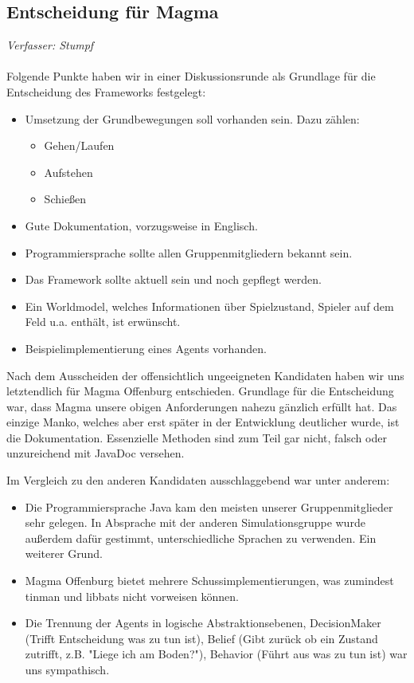 \documentclass[fontsize=12pt,a4paper,final]{scrartcl}[2003/01/01]
\begin{document}
\subsection{Entscheidung für Magma}
\textit{Verfasser: Stumpf}\\
\\
Folgende Punkte haben wir in einer Diskussionsrunde als Grundlage für die Entscheidung des Frameworks festgelegt:
\begin{itemize}
\item Umsetzung der Grundbewegungen soll vorhanden sein. Dazu zählen:
	\begin{itemize}
	\item Gehen/Laufen
	\item Aufstehen
	\item Schie{\ss}en
	\end{itemize}
\item Gute Dokumentation, vorzugsweise in Englisch.
\item Programmiersprache sollte allen Gruppenmitgliedern bekannt sein. 
\item Das Framework sollte aktuell sein und noch gepflegt werden.
\item Ein Worldmodel, welches Informationen über Spielzustand, Spieler auf dem Feld u.a. enthält, ist erwünscht.
\item Beispielimplementierung eines Agents vorhanden.
\end{itemize}

Nach dem Ausscheiden der offensichtlich ungeeigneten Kandidaten haben wir uns letztendlich für Magma Offenburg entschieden. Grundlage für die Entscheidung war, dass Magma unsere obigen Anforderungen nahezu gänzlich erfüllt hat. Das einzige Manko, welches aber erst später in der Entwicklung deutlicher wurde, ist die Dokumentation. Essenzielle Methoden sind zum Teil gar nicht, falsch oder unzureichend mit JavaDoc versehen.

Im Vergleich zu den anderen Kandidaten ausschlaggebend war unter anderem:
\begin{itemize}
\item Die Programmiersprache Java kam den meisten unserer Gruppenmitglieder sehr gelegen. In Absprache mit der anderen Simulationsgruppe wurde au{\ss}erdem dafür gestimmt, unterschiedliche Sprachen zu verwenden. Ein weiterer Grund.
\item Magma Offenburg bietet mehrere Schussimplementierungen, was zumindest tinman und libbats nicht vorweisen können.
\item Die Trennung der Agents in logische Abstraktionsebenen, DecisionMaker (Trifft Entscheidung was zu tun ist), Belief (Gibt zurück ob ein Zustand zutrifft, z.B. "Liege ich am Boden?"), Behavior (Führt aus was zu tun ist) war uns sympathisch.
\end{itemize}
\end{document}
